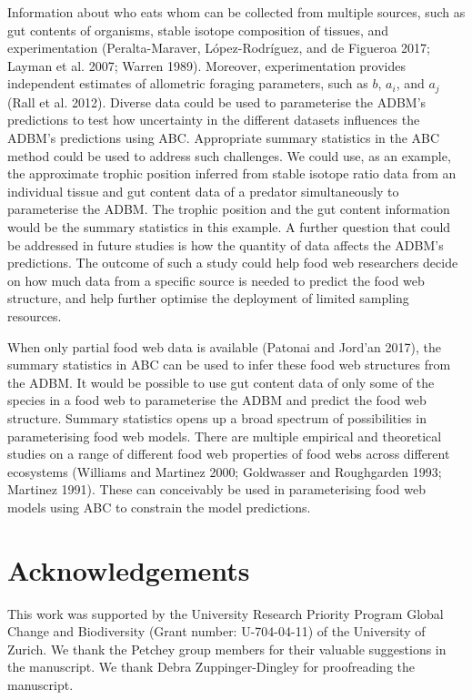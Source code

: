 \documentclass{article}
\begin{document}
Information about who eats whom can be collected from multiple sources,
such as gut contents of organisms, stable isotope composition of
tissues, and experimentation (Peralta-Maraver, López-Rodríguez, and de
Figueroa 2017; Layman et al. 2007; Warren 1989). Moreover,
experimentation provides independent estimates of allometric foraging
parameters, such as \(b\), \(a_i\), and \(a_j\) (Rall et al. 2012).
Diverse data could be used to parameterise the ADBM's predictions to
test how uncertainty in the different datasets influences the ADBM's
predictions using ABC. Appropriate summary statistics in the ABC method
could be used to address such challenges. We could use, as an example,
the approximate trophic position inferred from stable isotope ratio data
from an individual tissue and gut content data of a predator
simultaneously to parameterise the ADBM. The trophic position and the
gut content information would be the summary statistics in this example.
A further question that could be addressed in future studies is how the
quantity of data affects the ADBM's predictions. The outcome of such a
study could help food web researchers decide on how much data from a
specific source is needed to predict the food web structure, and help
further optimise the deployment of limited sampling resources.

When only partial food web data is available (Patonai and Jord'an 2017),
the summary statistics in ABC can be used to infer these food web
structures from the ADBM. It would be possible to use gut content data
of only some of the species in a food web to parameterise the ADBM and
predict the food web structure. Summary statistics opens up a broad
spectrum of possibilities in parameterising food web models. There are
multiple empirical and theoretical studies on a range of different food
web properties of food webs across different ecosystems (Williams and
Martinez 2000; Goldwasser and Roughgarden 1993; Martinez 1991). These
can conceivably be used in parameterising food web models using ABC to
constrain the model predictions.

\hypertarget{acknowledgements}{%
\section{Acknowledgements}\label{acknowledgements}}

This work was supported by the University Research Priority Program
Global Change and Biodiversity (Grant number: U-704-04-11) of the
University of Zurich. We thank the Petchey group members for their
valuable suggestions in the manuscript. We thank Debra Zuppinger-Dingley
for proofreading the manuscript.
\end{document}
